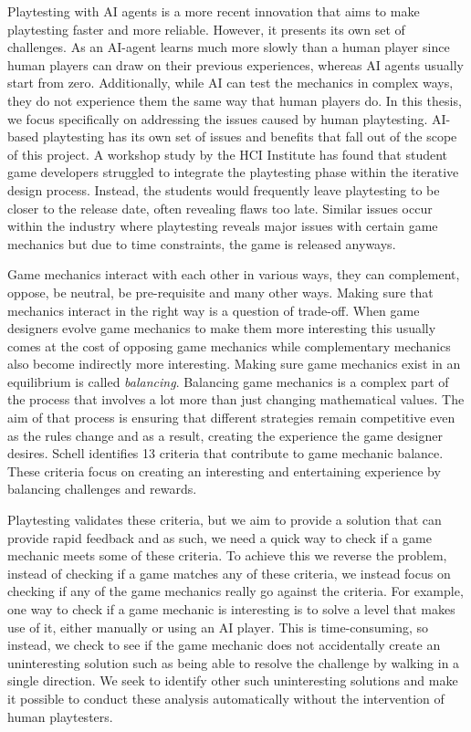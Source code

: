 Playtesting with AI agents is a more recent innovation that aims to make playtesting faster and more reliable\cite{DBLP:journals/corr/abs-1903-10545}. However, it presents its own set of challenges. As an AI-agent learns much more slowly than a human player since human players can draw on their previous experiences, whereas AI agents usually start from zero. Additionally, while AI can test the mechanics in complex ways, they do not experience them the same way that human players do. In this thesis, we focus specifically on addressing the issues caused by human playtesting. AI-based playtesting has its own set of issues and benefits that fall out of the scope of this project. A workshop study by the HCI Institute\cite{10.1145/2967934.2968103} has found that student game developers struggled to integrate the playtesting phase within the iterative design process. Instead, the students would frequently leave playtesting to be closer to the release date, often revealing flaws too late. Similar issues occur within the industry where playtesting reveals major issues with certain game mechanics but due to time constraints, the game is released anyways. 

Game mechanics interact with each other in various ways, they can complement, oppose, be neutral, be pre-requisite and many other ways. Making sure that mechanics interact in the right way is a question of trade-off. When game designers evolve game mechanics to make them more interesting this usually comes at the cost of opposing game mechanics while complementary mechanics also become indirectly more interesting. Making sure game mechanics exist in an equilibrium is called \emph{balancing}. Balancing game mechanics is a complex part of the process that involves a lot more than just changing mathematical values. The aim of that process is ensuring that different strategies remain competitive even as the rules change and as a result, creating the experience the game designer desires. Schell\cite{schell2008art} identifies 13 criteria that contribute to game mechanic balance. These criteria focus on creating an interesting and entertaining experience by balancing challenges and rewards. 

Playtesting validates these criteria, but we aim to provide a solution that can provide rapid feedback and as such, we need a quick way to check if a game mechanic meets some of these criteria. To achieve this we reverse the problem, instead of checking if a game matches any of these criteria, we instead focus on checking if any of the game mechanics really go against the criteria. For example, one way to check if a game mechanic is interesting is to solve a level that makes use of it, either manually or using an AI player. This is time-consuming, so instead, we check to see if the game mechanic does not accidentally create an uninteresting solution such as being able to resolve the challenge by walking in a single direction. We seek to identify other such uninteresting solutions and make it possible to conduct these analysis automatically without the intervention of human playtesters.

